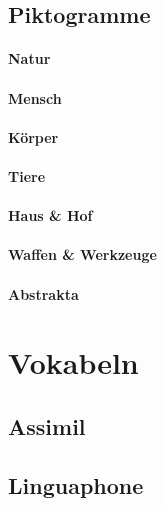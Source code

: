 \documentclass[justified, a4paper, notitlepage, captions=tableheading, nobib]{tufte-handout}
\begin{document}
\subsection{Piktogramme}
\label{sec:org054439a}

\paragraph{Natur}
\label{sec:orgb70671a}

\paragraph{Mensch}
\label{sec:orgbc0dae9}

\paragraph{Körper}
\label{sec:org5d83a93}

\paragraph{Tiere}
\label{sec:orgc8af5d3}

\paragraph{Haus \& Hof}
\label{sec:org56a136b}

\paragraph{Waffen \& Werkzeuge}
\label{sec:org50f64ca}

\paragraph{Abstrakta}
\label{sec:org936eab9}

\newpage
\section{Vokabeln }
\label{sec:org9f79b4c}

\subsection{Assimil}
\label{sec:orgf88ddc2}

\subsection{Linguaphone}
\label{sec:orgd5b3109}
\end{document}
